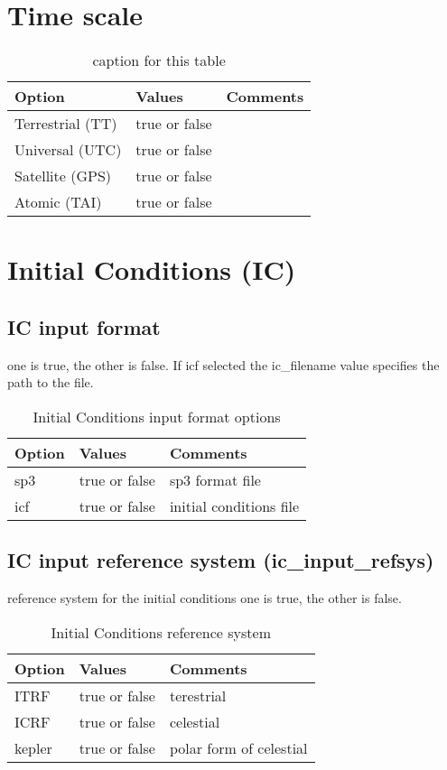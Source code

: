\section{Time scale}
%
\begin{table}[h!]
\begin{tabular}{|p{2.5cm}|p{2.5cm}|p{5cm}|}
\hline
Option & Values & Comments \\
\hline
Terrestrial (TT) & true or false & \\
Universal (UTC)& true or false & \\
Satellite (GPS)& true or false & \\
Atomic (TAI)& true or false & \\
\hline
\end{tabular}
\caption{caption for this table}
\label{table:label_name}
\end{table}
%
%
\section{Initial Conditions (IC)}
\subsection{IC input format}
 one is true, the other is false. If icf selected the ic\_filename value specifies the path to the file.
\begin{table}[h!]
\begin{tabular}{|p{2.5cm}|p{2.5cm}|p{5cm}|}
	\hline
	Option & Values & Comments \\
	\hline
   sp3 & true or false & sp3 format file\\
   icf & true or false & initial conditions file\\
   \hline
\end{tabular}
\caption{Initial Conditions input format options}
\label{table:yaml}
\end{table}
%
\subsection{IC input reference system (ic\_input\_refsys)}
reference system for the initial conditions one is true, the other is false. 
\begin{table}[h!]
	\begin{tabular}{|p{2.5cm}|p{2.5cm}|p{5cm}|}
		\hline
		Option & Values & Comments \\
		\hline
		ITRF & true or false & terestrial\\
		ICRF & true or false & celestial \\
		kepler & true or false & polar form of celestial\\
		\hline
	\end{tabular}
	\caption{Initial Conditions reference system}
	\label{table:yaml}
\end{table}


